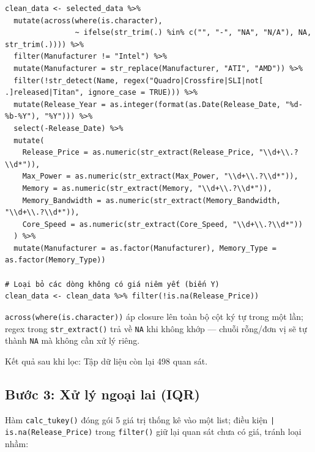\begin{verbatim}
clean_data <- selected_data %>%
  mutate(across(where(is.character), 
                ~ ifelse(str_trim(.) %in% c("", "-", "NA", "N/A"), NA, str_trim(.)))) %>%
  filter(Manufacturer != "Intel") %>%
  mutate(Manufacturer = str_replace(Manufacturer, "ATI", "AMD")) %>%
  filter(!str_detect(Name, regex("Quadro|Crossfire|SLI|not[ .]released|Titan", ignore_case = TRUE))) %>%
  mutate(Release_Year = as.integer(format(as.Date(Release_Date, "%d-%b-%Y"), "%Y"))) %>%
  select(-Release_Date) %>%
  mutate(
    Release_Price = as.numeric(str_extract(Release_Price, "\\d+\\.?\\d*")),
    Max_Power = as.numeric(str_extract(Max_Power, "\\d+\\.?\\d*")),
    Memory = as.numeric(str_extract(Memory, "\\d+\\.?\\d*")),
    Memory_Bandwidth = as.numeric(str_extract(Memory_Bandwidth, "\\d+\\.?\\d*")),
    Core_Speed = as.numeric(str_extract(Core_Speed, "\\d+\\.?\\d*"))
  ) %>%
  mutate(Manufacturer = as.factor(Manufacturer), Memory_Type = as.factor(Memory_Type))

# Loại bỏ các dòng không có giá niêm yết (biến Y)
clean_data <- clean_data %>% filter(!is.na(Release_Price))
\end{verbatim}
\texttt{across(where(is.character))} áp closure lên toàn bộ cột ký tự trong một lần; regex trong \texttt{str\_extract()} trả về \texttt{NA} khi không khớp — chuỗi rỗng/đơn vị sẽ tự thành \texttt{NA} mà không cần xử lý riêng.

Kết quả sau khi lọc: Tập dữ liệu còn lại 498 quan sát.

\subsection{Bước 3: Xử lý ngoại lai (IQR)}
\label{sec:buoc_3}
Hàm \texttt{calc\_tukey()} đóng gói 5 giá trị thống kê vào một list; điều kiện \texttt{| is.na(Release\_Price)} trong \texttt{filter()} giữ lại quan sát chưa có giá, tránh loại nhầm:

